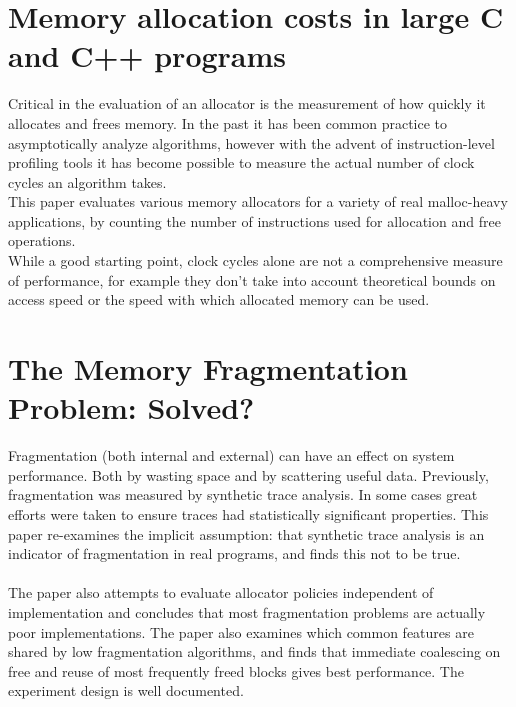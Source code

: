 \documentclass{report}
\begin{document}
\section[Allocation Costs]{Memory allocation costs in large C and C++ programs}
Critical in the evaluation of an allocator is the measurement of how quickly it allocates and frees memory. In the past it has been common practice to asymptotically analyze algorithms, however with the advent of instruction-level profiling tools it has become possible to measure the actual number of clock cycles an algorithm takes.\\
This paper evaluates various memory allocators for a variety of real malloc-heavy applications, by counting the number of instructions used for allocation and free operations.\\
While a good starting point, clock cycles alone are not a comprehensive measure of performance, for example they don't take into account theoretical bounds on access speed or the speed with which allocated memory can be used. \cite{10.1002/spe.4380240602}

\pagebreak

\section[Fragmentation]{The Memory Fragmentation Problem: Solved?}
Fragmentation (both internal and external) can have an effect on system performance. Both by wasting space and by scattering useful data. Previously, fragmentation was measured by synthetic trace analysis. In some cases great efforts were taken to ensure traces had statistically significant properties. This paper re-examines the implicit assumption: that synthetic trace analysis is an indicator of fragmentation in real programs, and finds this not to be true.\\
\\
The paper also attempts to evaluate allocator policies independent of implementation and concludes that most fragmentation problems are actually poor implementations. The paper also examines which common features are shared by low fragmentation algorithms, and finds that immediate coalescing on free and reuse of most frequently freed blocks gives best performance. The experiment design is well documented. \cite{10.1145/301589.286864}
\end{document}

